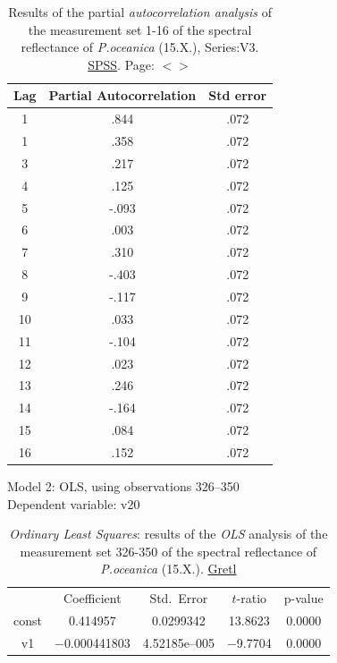 \documentclass[11pt]{article}
\begin{document}
\begin{appendices}
\begin{table}[htbp]
	\caption{Results of the partial \textit{autocorrelation analysis} of the measurement set 1-16 of the spectral reflectance of \textit{P.oceanica} (15.X.), Series:V3. \href{http://www.spss.com/}{SPSS}. Page: $<$\pageref{page-41}$>$}\label{tab:14}
	\begin{center}
	\begin{tabular}{|c|c|c|}
		\hline\hline
			Lag & Partial Autocorrelation & Std error\\ \hline\hline
			1 & .844 & .072 \\ \hline
			1 &.358 & .072 \\ \hline
			3 & .217 &.072 \\ \hline
			4 & .125 &.072 \\ \hline
			5 & -.093 & .072 \\ \hline
			6 & .003 & .072 \\ \hline
			7 & .310 & .072 \\ \hline
			8 & -.403 & .072 \\ \hline
			9 & -.117 & .072 \\ \hline
			10 & .033 & .072 \\ \hline
			11 & -.104 & .072 \\ \hline
			12 & .023 &.072 \\ \hline
			13 & .246 &.072 \\ \hline
			14 & -.164 & .072 \\ \hline
			15 & .084 & .072 \\ \hline
			16 & .152 & .072 \\ \hline
	\end{tabular}
	\end{center}
\end{table}
\pagebreak

\begin{table}[H]
	\begin{center}
		\caption{\textit{Ordinary Least Squares}: results of the \textit{OLS} analysis of the measurement set 326-350 of the spectral reflectance of \textit{P.oceanica} (15.X.). \href{http://gretl.sourceforge.net/}{Gretl}}
		Model 2: OLS, using observations 326--350\\
		Dependent variable: v20 \\

		\vspace{1em}
		\begin{tabular}{c c c c c}
		  & {Coefficient} &  {Std.\ Error} &   {$t$-ratio} &    {p-value} \\[1ex]
		const &  0.414957 &    0.0299342 &      13.8623 &        0.0000 \\
		v1 &   $-$0.000441803 &     4.52185\textrm{e--005} &       $-$9.7704 &         0.0000 \\ \hline\hline
	\end{tabular}
	

\end{center}
\end{table}
\end{appendices}
\end{document}
